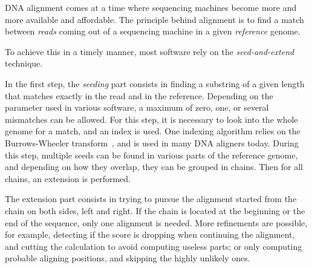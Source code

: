 DNA alignment comes at a time where sequencing machines become more and more available and affordable. The principle behind alignment is to find a match between \emph{reads} coming out of a sequencing machine in a given \emph{reference} genome. 

To achieve this in a timely manner, most software rely on the \emph{seed-and-extend} technique.

In the first step, the \emph{seeding} part consists in finding a substring of a given length that matches exactly in the read and in the reference. Depending on the parameter used in various software, a maximum of zero, one, or several mismatches can be allowed. For this step, it is necessary to look into the whole genome for a match, and an index is used. One indexing algorithm relies on the Burrows-Wheeler transform~\cite{BurrowsWheeler:align}, and is used in many DNA aligners today. During this step, multiple seeds can be found in various parts of the reference genome, and depending on how they overlap, they can be grouped in chains. Then for all chains, an extension is performed.

The extension part consists in trying to pursue the alignment started from the chain on both sides, left and right. If the chain is located at the beginning or the end of the sequence, only one alignment is needed. More refinements are possible, for example, detecting if the score is dropping when continuing the alignment, and cutting the calculation to avoid computing useless parts; or only computing probable aligning positions, and skipping the highly unlikely ones. %

